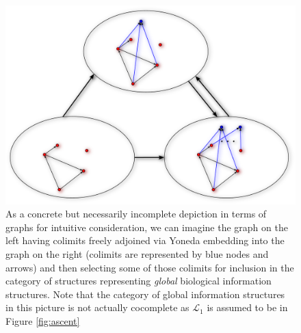 \documentclass[aps,twocolumn]{revtex4-1}
\begin{document}
\begin{figure}
\noindent\includegraphics[width=1.0\columnwidth]{fig/graphyonedaext.pdf}
\caption{As a concrete but necessarily incomplete depiction in terms of graphs for intuitive consideration, we can imagine the graph on the left having colimits freely adjoined via Yoneda embedding into the graph on the right (colimits are represented by blue nodes and arrows) and then selecting some of those colimits for inclusion in the category of structures representing {\it global} biological information structures. Note that the category of global information structures in this picture is not actually cocomplete as  $\mathcal{L}_1$ is assumed to be in Figure \ref{fig:ascent}}
\label{fig:graphyonedaext}
\end{figure}
\end{document}
